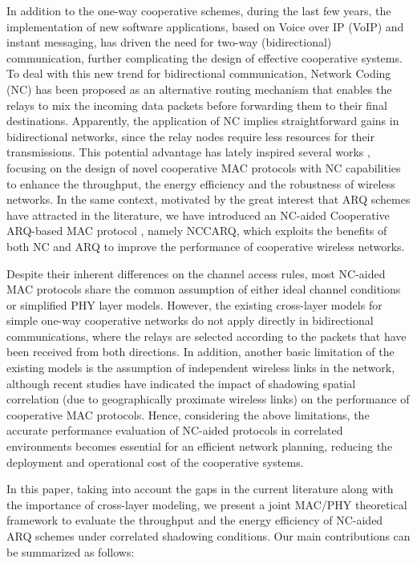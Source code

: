 \documentclass[12pt,draftcls, onecolumn]{IEEEtran}
\begin{document}
In addition to the one-way cooperative schemes, during the last few years, the implementation of new software applications, based on Voice over IP (VoIP) and instant messaging, has driven the need for two-way (bidirectional) communication, further complicating the design of effective cooperative systems. To deal with this new trend for bidirectional communication, Network Coding (NC) has been proposed as an alternative routing mechanism that enables the relays to mix the incoming data packets before forwarding them to their final destinations. Apparently, the application of NC implies straightforward gains in bidirectional networks, since the relay nodes require less resources for their transmissions. This potential advantage has lately inspired several works \cite{cope,argyriou,phoenix,wang,umehara}, focusing on the design of novel cooperative MAC protocols with NC capabilities to enhance the throughput, the energy efficiency and the robustness of wireless networks. In the same context, motivated by the great interest that ARQ schemes have attracted in the literature, we have introduced an NC-aided Cooperative ARQ-based MAC protocol \cite{nccarq}, namely NCCARQ, which exploits the benefits of both NC and ARQ to improve the performance of cooperative wireless networks.

Despite their inherent differences on the channel access rules, most NC-aided MAC protocols share the common assumption of either ideal channel conditions or simplified PHY layer models.  However, the existing cross-layer models for simple one-way cooperative networks do not apply directly in bidirectional communications, where the relays are selected according to the packets that have been received from both directions. In addition, another basic limitation of the existing models is the assumption of independent wireless links in the network, although recent studies \cite{cor1,cor2,cor3,cor4} have indicated the impact of shadowing spatial correlation (due to geographically proximate wireless links) on the performance of cooperative MAC protocols. Hence, considering the above limitations, the accurate performance evaluation of NC-aided protocols in correlated environments becomes essential for an efficient network planning, reducing the deployment and operational cost of the cooperative systems.

In this paper, taking into account the gaps in the current literature along with the importance of cross-layer modeling, we present a joint MAC/PHY theoretical framework to evaluate the throughput and the energy efficiency of NC-aided ARQ schemes under correlated shadowing conditions. Our main contributions can be summarized as follows:
\end{document}
